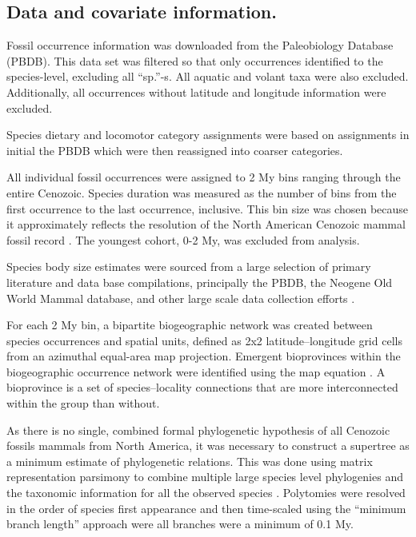 \documentclass{nature}
\begin{document}
\begin{methods}

  \subsection{Data and covariate information.}
  Fossil occurrence information was downloaded from the Paleobiology Database (PBDB). This data set was filtered so that only occurrences identified to the species-level, excluding all ``sp.''-s. All aquatic and volant taxa were also excluded. Additionally, all occurrences without latitude and longitude information were excluded.

  Species dietary and locomotor category assignments were based on assignments in initial the PBDB which were then reassigned into coarser categories.

  All individual fossil occurrences were assigned to 2 My bins ranging through the entire Cenozoic. Species duration was measured as the number of bins from the first occurrence to the last occurrence, inclusive. This bin size was chosen because it approximately reflects the resolution of the North American Cenozoic mammal fossil record \cite{Alroy2009,Marcot2014}. The youngest cohort, 0-2 My, was excluded from analysis.

  Species body size estimates were sourced from a large selection of primary literature and data base compilations, principally the PBDB, the Neogene Old World Mammal database, and other large scale data collection efforts \cite{Jones2009c,Smith2004c,Raia2012f,Freudenthal2013,McKenna2011}. 

  For each 2 My bin, a bipartite biogeographic network was created between species occurrences and spatial units, defined as 2x2 latitude--longitude grid cells from an azimuthal equal-area map projection. Emergent bioprovinces within the biogeographic occurrence network were identified using the map equation \cite{Rosvall2008,Vilhena2013}. A bioprovince is a set of species--locality connections that are more interconnected within the group than without.

  As there is no single, combined formal phylogenetic hypothesis of all Cenozoic fossils mammals from North America, it was necessary to construct a supertree as a minimum estimate of phylogenetic relations. This was done using matrix representation parsimony to combine multiple large species level phylogenies and the taxonomic information for all the observed species \cite{Raia2012f,Janis1998,Janis2008,Bininda-Emonds2007}. Polytomies were resolved in the order of species first appearance and then time-scaled using the ``minimum branch length'' approach were all branches were a minimum of 0.1 My.


\end{methods}
\end{document}
